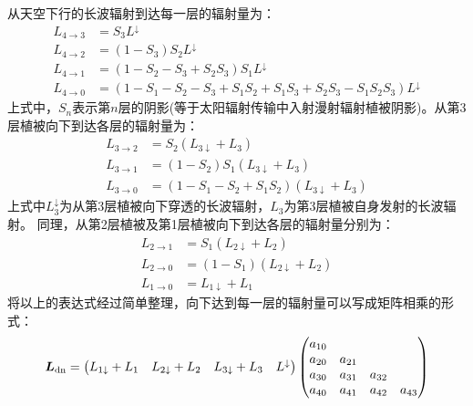 从天空下行的长波辐射到达每一层的辐射量为：
\begin{equation}
  \begin{aligned} L_{4 \rightarrow 3} &=S_{3} L^\downarrow \\ L_{4 \rightarrow 2} &=\left(1-S_{3}\right) S_{2} L^\downarrow
    \\ L_{4 \rightarrow 1} &=\left(1-S_{2}-S_{3}+S_{2} S_{3}\right) S_{1} L^\downarrow \\
  L_{4 \rightarrow 0} &=\left(1-S_{1}-S_{2}-S_{3}+S_{1} S_{2}+S_{1} S_{3}+S_{2} S_{3}-S_{1} S_{2} S_{3}\right) L^\downarrow \end{aligned}
\end{equation}
上式中，$S_n$表示第$n$层的阴影(等于太阳辐射传输中入射漫射辐射植被阴影)。从第3层植被向下到达各层的辐射量为：
\begin{equation}
  \begin{aligned}
    L_{3 \rightarrow 2} &=S_{2}\left(L_{3 \downarrow}+L_{3}\right) \\[1ex]
    L_{3 \rightarrow 1} &=\left(1-S_{2}\right) S_{1}\left(L_{3 \downarrow}+L_{3}\right) \\[1ex]
    L_{3 \rightarrow 0} &=\left(1-S_{1}-S_{2}+S_{1} S_{2}\right)\left(L_{3 \downarrow}+L_{3}\right)
  \end{aligned}
\end{equation}
上式中$L_3 ^\downarrow$为从第3层植被向下穿透的长波辐射，$L_3$为第3层植被自身发射的长波辐射。
同理，从第2层植被及第1层植被向下到达各层的辐射量分别为：
\begin{equation}
  \begin{aligned}
    L_{2 \rightarrow 1} &=S_{1}\left(L_{2 \downarrow}+L_{2}\right) \\[1ex]
    L_{2 \rightarrow 0} &=\left(1-S_{1}\right)\left(L_{2 \downarrow}+L_{2}\right) \\[1ex]
    L_{1 \rightarrow 0} &=L_{1 \downarrow}+L_{1}
  \end{aligned}
\end{equation}
将以上的表达式经过简单整理，向下达到每一层的辐射量可以写成矩阵相乘的形式：
\begin{equation}
  \boldsymbol{L}_{\rm dn}=\left(\begin{matrix}L_{1\downarrow}+L_1&L_{2\downarrow}+L_2&L_{3\downarrow}+L_3&L^\downarrow\\
  \end{matrix}\right)\left(\begin{matrix}a_{10}&&&\\a_{20}&a_{21}&&
  \\a_{30}&a_{31}&a_{32}&\\a_{40}&a_{41}&a_{42}&a_{43}\\\end{matrix}\right)
\end{equation}
